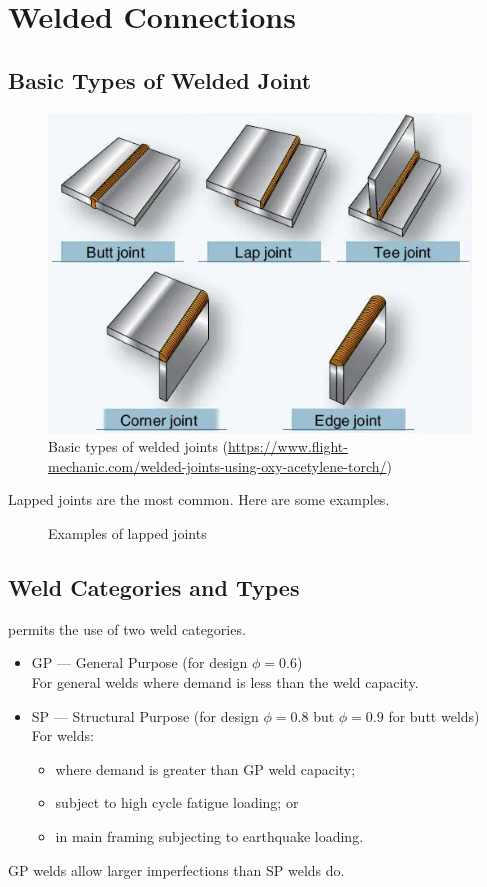 \chapter{Welded Connections}
\section{Basic Types of Welded Joint}
\begin{figure}[H]
\centering
\includegraphics[scale=.7]{PIC/CH07/WT}
\caption{Basic types of welded joints (\href{https://www.flight-mechanic.com/welded-joints-using-oxy-acetylene-torch/}{\url{https://www.flight-mechanic.com/welded-joints-using-oxy-acetylene-torch/}})}
\end{figure}
Lapped joints are the most common. Here are some examples.
\begin{figure}[H]
\footnotesize
\caption{Examples of lapped joints}
\end{figure}
\section{Weld Categories and Types}
\NZSSTEEL{} permits the use of two weld categories.
\begin{itemize}
\item GP --- General Purpose (for design $\phi=0.6$)\\For general welds where demand is less than the weld capacity.
\item SP --- Structural Purpose (for design $\phi=0.8$ but $\phi=0.9$ for butt welds)\\For welds:
\begin{itemize}
\item where demand is greater than GP weld capacity;
\item subject to high cycle fatigue loading; or
\item in main framing subjecting to earthquake loading.
\end{itemize}
\end{itemize}
GP welds allow larger imperfections than SP welds do.

